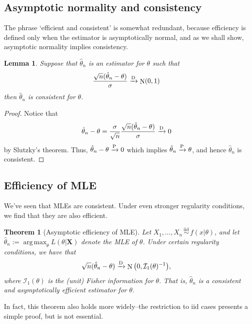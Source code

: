 \documentclass[
]{book}
\newcommand{\bX}{{\boldsymbol X}}
\DeclareMathOperator{\N}{N}
\newcommand{\iid}{\,\overset{\text{iid}}{\sim}\,}
\newcommand{\cI}{{\mathcal I}}
\DeclareMathOperator*{\argmax}{arg\,max}
\newtheorem{theorem}{Theorem}[chapter]
\newtheorem{lemma}{Lemma}[chapter]
\theoremstyle{definition}
\theoremstyle{definition}
\theoremstyle{definition}
\theoremstyle{definition}
\theoremstyle{remark}
\begin{document}
\hypertarget{asymptotic-normality-and-consistency}{%
\subsection{Asymptotic normality and consistency}\label{asymptotic-normality-and-consistency}}

The phrase `efficient and consistent' is somewhat redundant, because efficiency is defined only when the estimator is asymptotically normal, and as we shall show, asymptotic normality implies consistency.

\begin{lemma}
Suppose that \(\hat\theta_n\) is an estimator for \(\theta\) such that
\[
\frac{\sqrt n(\hat\theta_n - \theta)}{\sigma} \xrightarrow{\text D} \N(0,1)
\]
then \(\hat\theta_n\) is consistent for \(\theta\).
\end{lemma}

\begin{proof}
Notice that
\[
\hat\theta_n - \theta = \frac{\sigma}{\sqrt n}\frac{\sqrt n(\hat\theta_n - \theta)}{\sigma} \xrightarrow{\text D} 0
\]
by Slutzky's theorem. Thus, \(\hat\theta_n -\theta \xrightarrow{\text P} 0\) which implies \(\hat\theta_n \xrightarrow{\text P} \theta\), and hence \(\hat\theta_n\) is consistent.
\end{proof}

\hypertarget{efficiency-of-mle}{%
\subsection{Efficiency of MLE}\label{efficiency-of-mle}}

We've seen that MLEs are consistent. Under even stronger regularity conditions, we find that they are also efficient.

\begin{theorem}[Asymptotic efficiency of MLE]
Let \(X_1,\dots,X_n \iid f(x|\theta)\), and let \(\hat\theta_n:=\argmax_\theta L(\theta|\bX)\) denote the MLE of \(\theta\). Under certain regularity conditions, we have that
\[
\sqrt n (\hat\theta_n - \theta ) \xrightarrow{\text D} \N\big(0, \cI_1(\theta)^{-1}\big), 
\]
where \(\cI_1(\theta)\) is the (unit) Fisher information for \(\theta\). That is, \(\hat\theta_n\) is a consistent and asymptotically efficient estimator for \(\theta\).
\end{theorem}

In fact, this theorem also holds more widely--the restriction to iid cases presents a simple proof, but is not essential.
\end{document}
